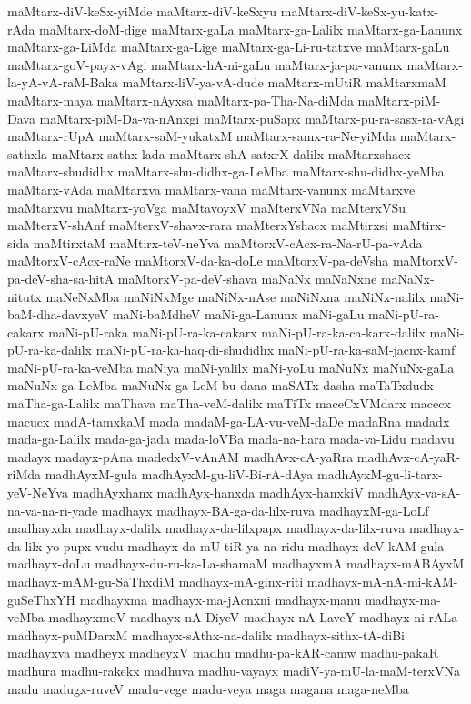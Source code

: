 {maMtarx-diV-keSx-yiMde
maMtarx-diV-keSxyu
maMtarx-diV-keSx-yu-katx-rAda
maMtarx-doM-dige
maMtarx-gaLa
maMtarx-ga-Lalilx
maMtarx-ga-Lanunx
maMtarx-ga-LiMda
maMtarx-ga-Lige
maMtarx-ga-Li-ru-tatxve
maMtarx-gaLu
maMtarx-goV-payx-vAgi
maMtarx-hA-ni-gaLu
maMtarx-ja-pa-vanunx
maMtarx-la-yA-vA-raM-Baka
maMtarx-liV-ya-vA-dude
maMtarx-mUtiR
maMtarxmaM
maMtarx-maya
maMtarx-nAyxsa
maMtarx-pa-Tha-Na-diMda
maMtarx-piM-Dava
maMtarx-piM-Da-va-nAnxgi
maMtarx-puSapx
maMtarx-pu-ra-sasx-ra-vAgi
maMtarx-rUpA
maMtarx-saM-yukatxM
maMtarx-samx-ra-Ne-yiMda
maMtarx-sathxla
maMtarx-sathx-lada
maMtarx-shA-satxrX-dalilx
maMtarxshacx
maMtarx-shudidhx
maMtarx-shu-didhx-ga-LeMba
maMtarx-shu-didhx-yeMba
maMtarx-vAda
maMtarxva
maMtarx-vana
maMtarx-vanunx
maMtarxve
maMtarxvu
maMtarx-yoVga
maMtavoyxV
maMterxVNa
maMterxVSu
maMterxV-shAnf
maMterxV-shavx-rara
maMterxYshacx
maMtirxsi
maMtirx-sida
maMtirxtaM
maMtirx-teV-neYva
maMtorxV-cAcx-ra-Na-rU-pa-vAda
maMtorxV-cAcx-raNe
maMtorxV-da-ka-doLe
maMtorxV-pa-deVsha
maMtorxV-pa-deV-sha-sa-hitA
maMtorxV-pa-deV-shava
maNaNx
maNaNxne
maNaNx-nitutx
maNeNxMba
maNiNxMge
maNiNx-nAse
maNiNxna
maNiNx-nalilx
maNi-baM-dha-davxyeV
maNi-baMdheV
maNi-ga-Lanunx
maNi-gaLu
maNi-pU-ra-cakarx
maNi-pU-raka
maNi-pU-ra-ka-cakarx
maNi-pU-ra-ka-ca-karx-dalilx
maNi-pU-ra-ka-dalilx
maNi-pU-ra-ka-haq-di-shudidhx
maNi-pU-ra-ka-saM-jacnx-kamf
maNi-pU-ra-ka-veMba
maNiya
maNi-yalilx
maNi-yoLu
maNuNx
maNuNx-gaLa
maNuNx-ga-LeMba
maNuNx-ga-LeM-bu-dana
maSATx-dasha
maTaTxdudx
maTha-ga-Lalilx
maThava
maTha-veM-dalilx
maTiTx
maceCxVMdarx
macecx
macucx
madA-tamxkaM
mada
madaM-ga-LA-vu-veM-daDe
madaRna
madadx
mada-ga-Lalilx
mada-ga-jada
mada-loVBa
mada-na-hara
mada-va-Lidu
madavu
madayx
madayx-pAna
madedxV-vAnAM
madhAvx-cA-yaRra
madhAvx-cA-yaR-riMda
madhAyxM-gula
madhAyxM-gu-liV-Bi-rA-dAya
madhAyxM-gu-li-tarx-yeV-NeYva
madhAyxhanx
madhAyx-hanxda
madhAyx-hanxkiV
madhAyx-va-sA-na-va-na-ri-yade
madhayx
madhayx-BA-ga-da-lilx-ruva
madhayxM-ga-LoLf
madhayxda
madhayx-dalilx
madhayx-da-lilxpapx
madhayx-da-lilx-ruva
madhayx-da-lilx-yo-pupx-vudu
madhayx-da-mU-tiR-ya-na-ridu
madhayx-deV-kAM-gula
madhayx-doLu
madhayx-du-ru-ka-La-shamaM
madhayxmA
madhayx-mABAyxM
madhayx-mAM-gu-SaThxdiM
madhayx-mA-ginx-riti
madhayx-mA-nA-mi-kAM-guSeThxYH
madhayxma
madhayx-ma-jAcnxni
madhayx-manu
madhayx-ma-veMba
madhayxmoV
madhayx-nA-DiyeV
madhayx-nA-LaveY
madhayx-ni-rALa
madhayx-puMDarxM
madhayx-sAthx-na-dalilx
madhayx-sithx-tA-diBi
madhayxva
madheyx
madheyxV
madhu
madhu-pa-kAR-camw
madhu-pakaR
madhura
madhu-rakekx
madhuva
madhu-vayayx
madiV-ya-mU-la-maM-terxVNa
madu
madugx-ruveV
madu-vege
madu-veya
maga
magana
maga-neMba
}
